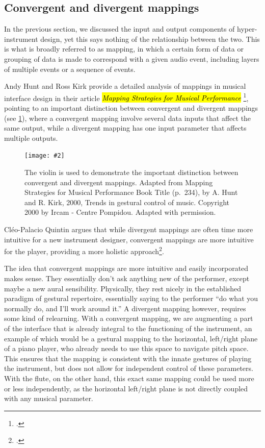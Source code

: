 \documentclass[12pt,twoside,maitrise]{dms_ks}
\newcommand{\customincludegraphics}[4][]{%
    \begin{figure}[H]
        \centering
        \texttt{[image: \#2]}
        \caption{#4}
	\label{#3} 
    \end{figure}
}
\theoremstyle{definition}
\begin{document}
{\subsection{Convergent and divergent mappings}

In the previous section, we discussed the input and output components of hyper-instrument design, yet this says nothing of the relationship between the two.
This is what is broadly referred to as mapping, in which a certain form of data or grouping of data is made to correspond with a given audio event, including layers of multiple events or a sequence of events. 

Andy Hunt and Ross Kirk provide a detailed analysis of mappings in musical interface design in their article \hl{\textit{Mapping Strategies for Musical Performance}} \footcite{hunt_mapping_2000}, pointing to an important distinction between convergent and divergent mappings (see \cref{fig:mapping}), where a convergent mapping involve several data inputs that affect the same output, while a divergent mapping has one input parameter that affects multiple outputs. 


\customincludegraphics[scale=1]{mapping.png}{fig:mapping}{The violin is used to demonstrate the important distinction between convergent and divergent mappings. Adapted from Mapping Strategies for Musical Performance Book Title (p.~234), by A. Hunt and R. Kirk, 2000, Trends in gestural control of music. Copyright 2000 by Ircam - Centre Pompidou. Adapted with permission.}

Cléo-Palacio Quintin argues that while divergent mappings are often time more intuitive for a new instrument designer, convergent mappings are more intuitive for the player, providing a more holistic approach\footcite[44--45]{palacio-quintin_composition_2012-1}. 

The idea that convergent mappings are more intuitive and easily incorporated makes sense. 
They essentially don't ask anything new of the performer, except maybe a new aural sensibility. 
Physically, they rest nicely in the established paradigm of gestural repertoire, essentially saying to the performer “do what you normally do, and I'll work around it.” A divergent mapping however, requires some kind of relearning. 
With a convergent mapping, we are augmenting a part of the interface that is already integral to the functioning of the instrument, an example of which would be a gestural mapping to the horizontal, left/right plane of a piano player, who already needs to use this space to navigate pitch space.
This ensures that the mapping is consistent with the innate gestures of playing the instrument, but does not allow for independent control of these parameters.
With the flute, on the other hand, this exact same mapping could be used more or less independently, as the horizontal left/right plane is not directly coupled with any musical parameter.

}
\end{document}
